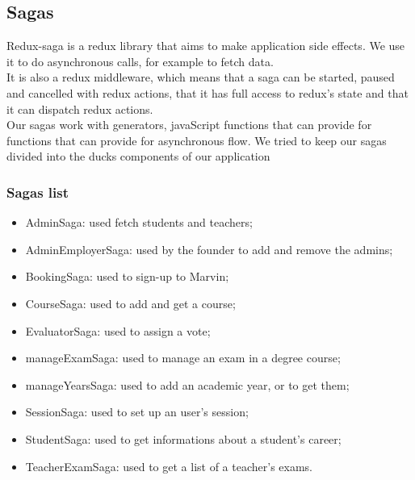 
	\subsection{Sagas}
	Redux-saga is a redux library that aims to make application side effects. We use it to do asynchronous calls, for example to fetch data.\\
	It is also a redux middleware, which means that a saga can be started, paused and cancelled with redux actions, that it has full access to redux's state and that it can dispatch redux actions.\\
	Our sagas work with generators, javaScript functions that can provide for functions that can provide for asynchronous flow. We tried to keep our sagas divided into the ducks components of our application
	
	\subsubsection{Sagas list}
	\begin{itemize}
		\item AdminSaga: used fetch students and teachers;
		\item AdminEmployerSaga: used by the founder to add and remove the admins;
		\item BookingSaga: used to sign-up to Marvin;
		\item CourseSaga: used to add and get a course;
		\item EvaluatorSaga: used to assign a vote;
		\item manageExamSaga: used to manage an exam in a degree course;
		\item manageYearsSaga: used to add an academic year, or to get them;
		\item SessionSaga: used to set up an user's session;
		\item StudentSaga: used to get informations about a student's career;
		\item TeacherExamSaga: used to get a list of a teacher's exams.
	\end{itemize}

